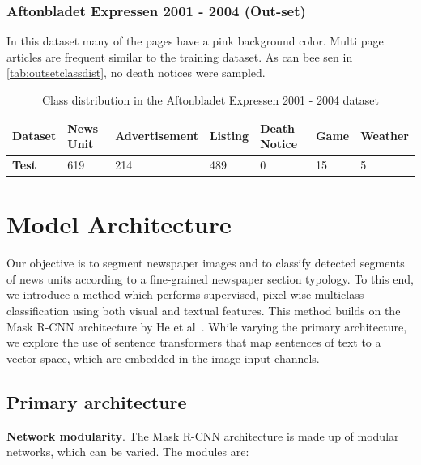\documentclass[oneside, english, bibtex]{kththesis}
\begin{document}
\subsubsection{Aftonbladet Expressen 2001 - 2004 (Out-set)}

In this dataset many of the pages have a pink background color. Multi page articles are frequent similar to the training dataset. As can bee sen in \autoref{tab:outsetclassdist}, no death notices were sampled. 

\begin{table}[!ht]
  \begin{center}
    \caption{Class distribution in the Aftonbladet Expressen 2001 - 2004 dataset}
    \label{tab:outsetclassdist}
    \begin{tabular}{l|l|l|l|l|l|l} %
    \textbf{Dataset} & \textbf{News Unit} & \textbf{Advertisement} & \textbf{Listing} & \textbf{Death Notice} & \textbf{Game} & \textbf{Weather}  \\
    \hline
    \textbf{Test} & 619 & 214 & 489 & 0 & 15 & 5 \\    \hline
    \end{tabular}
  \end{center}
\end{table}

\clearpage

\section{Model Architecture}
\label{sec:modelarch}

Our objective is to segment newspaper images and to classify detected segments of news units according to a fine-grained newspaper section typology. To this end, we introduce a method which performs supervised, pixel-wise multiclass classification using both visual and textual features. This method builds on the Mask R-CNN architecture by He et al~\cite{DBLP:journals/corr/HeGDG17}. While varying the primary architecture, we explore the use of sentence transformers that map sentences of text to a vector space, which are embedded in the image input channels.

\subsection{Primary architecture}

\textbf{Network modularity}. The Mask R-CNN architecture is made up of modular networks, which can be varied. The modules are:
\end{document}
